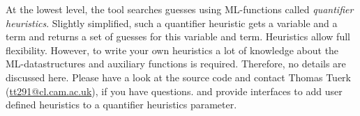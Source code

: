 At the lowest level, the tool searches guesses using ML-functions
called \emph{quantifier heuristics}. Slightly simplified, such a
quantifier heuristic gets a variable and a term and returns a set of
guesses for this variable and term. Heuristics allow full
flexibility. However, to write your own heuristics a lot of knowledge
about the ML-datastructures and auxiliary functions is
required. Therefore, no details are discussed here. Please have a look
at the source code and contact Thomas Tuerk
(\url{tt291@cl.cam.ac.uk}), if you have questions.
 and  provide
interfaces to add user defined heuristics to a quantifier heuristics
parameter.



